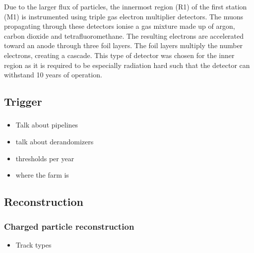 Due to the larger flux of particles, the innermost region (R1) of the first station (M1) is instrumented using triple gas electron multiplier detectors. The muons propagating through these detectors ionise a gas mixture made up of argon, carbon dioxide and tetrafluoromethane. The resulting electrons are accelerated toward an anode through three foil layers. The foil layers multiply the number electrons, creating a cascade. 
This type of detector was chosen for the inner region as it is required to be especially radiation hard such that the detector can withstand 10 years of operation.  

\subsection{Trigger}
\label{sec:Dec_trigger}
\subsubsection{\lone}


{\color{Red}
\begin{itemize}
\item Talk about pipelines
\item talk about derandomizers 
\item thresholds per year
\item where the farm is
\end{itemize}
}


\subsubsection{\hltone}
\subsubsection{\hlttwo}

\subsection{Reconstruction}
\subsubsection{Charged particle reconstruction}


{\color{Red}
\begin{itemize}
\item Track types
\end{itemize}
}

